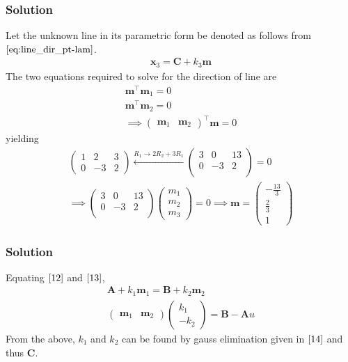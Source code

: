 \documentclass{beamer}
\theoremstyle{remark}
\newcommand{\myvec}[1]{\ensuremath{\begin{pmatrix}#1\end{pmatrix}}}
\let\vec\mathbf
\begin{document}
\begin{frame}
\frametitle{Solution}
Let the unknown line in its parametric form be denoted as follows from $\eqref{eq:line_dir_pt-lam}$.
\begin{align}
    \vec{x}_3 = \vec{C} + k_3\vec{m}
\end{align}
The two equations required to solve for the direction of line are 
\begin{align}
\vec{m}^\top\vec{m}_1 = 0\\
\vec{m}^\top\vec{m}_2 = 0\\
	\implies \myvec{\vec{m}_1 &\vec{m}_2}^{\top}\vec{m} = 0
\end{align}
yielding
\begin{align}
    \myvec{
        1 & 2 & 3\\
        0 & -3 & 2   
    } \xleftarrow{R_1 \to 2R_2 + 3R_1} \myvec{
        3 & 0 & 13\\
        0 & -3 & 2   \\
    } = 0\\
  \implies  \myvec{
        3 & 0 & 13\\
        0 & -3 & 2   \\
    }\myvec{
        m_1\\
        m_2\\
        m_3
    } = 0
    \implies \vec{m} = \myvec{
	    -\frac{13}{3}\\[1ex]
        \frac{2}{3}\\[1ex]
        1
    }
\end{align}
\end{frame}
%
\begin{frame}
\frametitle{Solution}
Equating $\eqref{12}$ and $\eqref{13}$,
\begin{align}
    \vec{A} + k_1\vec{m}_1 = \vec{B} + k_2\vec{m}_2\\
    \myvec{
        \vec{m}_1 & \vec{m}_2
    }\myvec{
        k_1 \\
        -k_2
    } = \vec{B}-\vec{A}
	\label{eq:non-skew}
	u
\end{align}
From the above, $k_1$ and $k_2$ can be found by gauss elimination given in $\eqref{14}$ and thus $\vec{C}$.

\end{frame}
\end{document}
